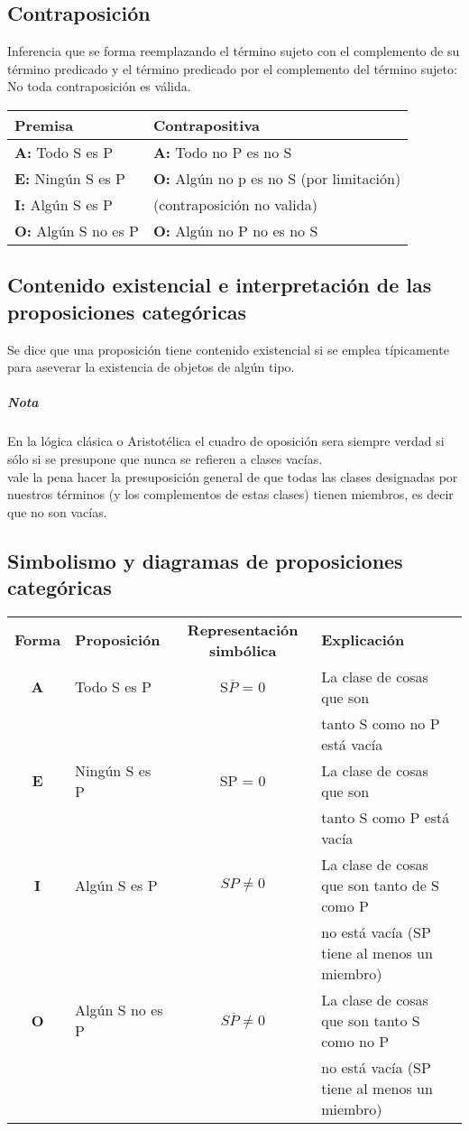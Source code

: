 \documentclass[10pt]{book} 						%
\begin{document}
\subsection{Contraposición}
Inferencia que se forma reemplazando el término sujeto con el complemento de su término predicado y el término predicado por el complemento del término sujeto: No toda contraposición es válida.
\begin{center}
\begin{tabular}{l l }
\textbf{Premisa} & \textbf{Contrapositiva}\\
\hline
\textbf{A:} Todo S es P & \textbf{A:} Todo no P es no S\\
\textbf{E:} Ningún S es P & \textbf{O:} Algún no p es no S (por limitación)\\
\textbf{I:} Algún S es P & (contraposición no valida)\\
\textbf{O:} Algún S no es P & \textbf{O:} Algún no P no es no S\\
\end{tabular}
\end{center}

\subsection{Contenido existencial e interpretación de las proposiciones categóricas}
Se dice que una proposición tiene contenido existencial si se emplea típicamente para aseverar la existencia de objetos de algún tipo.
\subparagraph{Nota}
En la lógica clásica o Aristotélica
el cuadro de oposición sera siempre verdad si sólo si se presupone que nunca se refieren a clases vacías.\\
vale la pena hacer la presuposición general de que todas las clases designadas por nuestros términos (y los complementos de estas clases) tienen miembros, es decir que no son vacías.

\subsection{Simbolismo y diagramas de proposiciones categóricas}
\begin{center}
\begin{tabular}{c l c l}
\textbf{Forma}&\textbf{Proposición}&\textbf{Representación simbólica}&\textbf{Explicación}\\
\textbf{A}& Todo S es P & S$\overline{P}$ = 0 & La clase de cosas que son  \\
&&&tanto S como no P está vacía\\
\textbf{E}&Ningún S es P& SP = 0 & La clase de cosas que son \\
&&&tanto S como P está vacía\\
\textbf{I}&Algún S es P & $SP \neq 0$ & La clase de cosas que son tanto de S como P\\
&&&no está vacía (SP tiene al menos un miembro)\\
\textbf{O}&Algún S no es P& $S\overline{P} \neq 0$ & La clase de cosas que son tanto S como no P \\
&&&no está vacía (SP tiene al menos un miembro)\\
\end{tabular}
\end{center}
\end{document}
